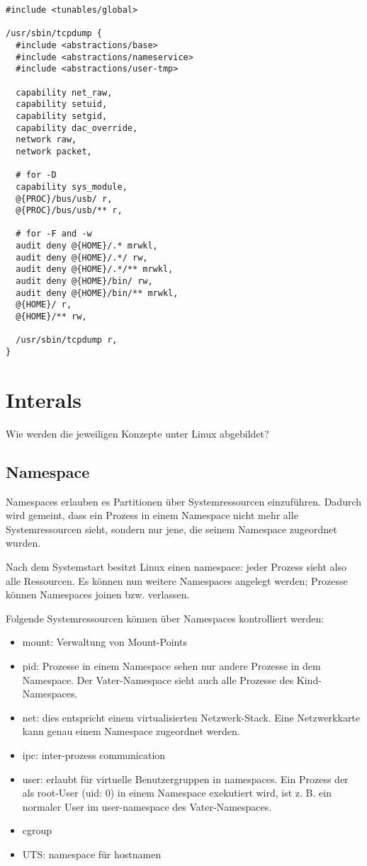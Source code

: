 \begin{verbatim}
#include <tunables/global>

/usr/sbin/tcpdump {
  #include <abstractions/base>
  #include <abstractions/nameservice>
  #include <abstractions/user-tmp>

  capability net_raw,
  capability setuid,
  capability setgid,
  capability dac_override,
  network raw,
  network packet,

  # for -D
  capability sys_module,
  @{PROC}/bus/usb/ r,
  @{PROC}/bus/usb/** r,

  # for -F and -w
  audit deny @{HOME}/.* mrwkl,
  audit deny @{HOME}/.*/ rw,
  audit deny @{HOME}/.*/** mrwkl,
  audit deny @{HOME}/bin/ rw,
  audit deny @{HOME}/bin/** mrwkl,
  @{HOME}/ r,
  @{HOME}/** rw,

  /usr/sbin/tcpdump r,
}
\end{verbatim}

\chapter{Interals}

Wie werden die jeweiligen Konzepte unter Linux abgebildet?

\section{Namespace}

Namespaces erlauben es Partitionen über Systemressourcen einzuführen. Dadurch wird gemeint, dass ein Prozess in einem Namespace nicht mehr alle Systemressourcen sieht, sondern nur jene, die seinem Namespace zugeordnet wurden.

Nach dem Systemstart besitzt Linux einen namespace: jeder Prozess sieht also alle Ressourcen. Es können nun weitere Namespaces angelegt werden; Prozesse können Namespaces joinen bzw. verlassen.

Folgende Systemressourcen können über Namespaces kontrolliert werden:

\begin{itemize}
	\item mount: Verwaltung von Mount-Points
	\item pid: Prozesse in einem Namespace sehen nur andere Prozesse in dem Namespace. Der Vater-Namespace sieht auch alle Prozesse des Kind-Namespaces.
	\item net: dies entspricht einem virtualisierten Netzwerk-Stack. Eine Netzwerkkarte kann genau einem Namespace zugeordnet werden.
	\item ipc: inter-prozess communication
	\item user: erlaubt für virtuelle Benutzergruppen in namespaces. Ein Prozess der als root-User (uid: 0) in einem Namespace exekutiert wird, ist z. B. ein normaler User im user-namespace des Vater-Namespaces.
	\item cgroup
	\item UTS: namespace für hostnamen
\end{itemize}

